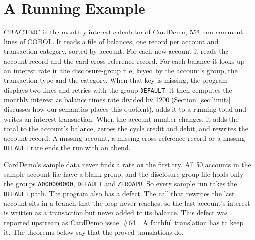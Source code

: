 \section{A Running Example}
\label{sec:example}

CBACT04C is the monthly interest calculator of CardDemo, 552 non-comment lines of COBOL. It reads a file of balances, one record
per account and transaction category, sorted by account. For each new account it reads the account record and the
card cross-reference record. For each balance it looks up an interest rate in the disclosure-group file, keyed by the
account's group, the transaction type and the category. When that key is missing, the program displays two lines and
retries with the group \texttt{DEFAULT}. It then computes the monthly interest as balance times rate divided by 1200 (Section~\ref{sec:limits} discusses how
our semantics places this quotient), adds it to a running total and writes an interest transaction. When the account number changes, it adds the total to
the account's balance, zeroes the cycle credit and debit, and rewrites the account record. A missing account, a missing
cross-reference record or a missing \texttt{DEFAULT} rate ends the run with an abend.

CardDemo's sample data never finds a rate on the first try. All 50
accounts in the sample account file have a blank group, and the disclosure-group file holds only the groups
\texttt{A000000000}, \texttt{DEFAULT} and \texttt{ZEROAPR}. So every sample run takes the \texttt{DEFAULT} path. The program also has a defect. The call that rewrites the last account sits in a branch that the loop never reaches,
so the last account's interest is written as a transaction but never added to its balance. This defect was reported upstream as CardDemo
issue~\#64~\cite{carddemo64}. A faithful translation has to keep it. The theorems below say that the
proved translations do.

